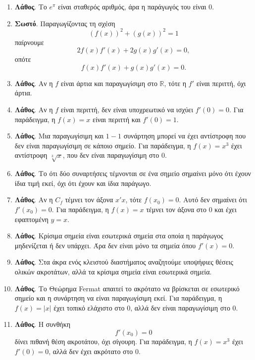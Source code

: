 \begin{enumerate}[label=\textbf{2.\arabic*.}]
\item \textbf{Λάθος}. Το $e^\pi$ είναι σταθερός αριθμός, άρα η παράγωγός του είναι $0$.

\item \textbf{Σωστό}. Παραγωγίζοντας τη σχέση
\[
(f(x))^2+(g(x))^2=1
\]
παίρνουμε
\[
2f(x)f'(x)+2g(x)g'(x)=0,
\]
οπότε
\[
f(x)f'(x)+g(x)g'(x)=0.
\]

\item \textbf{Λάθος}. Αν η $f$ είναι άρτια και παραγωγίσιμη στο $\mathbb{R}$, τότε η $f'$ είναι περιττή, όχι άρτια.

\item \textbf{Λάθος}. Αν η $f$ είναι περιττή, δεν είναι υποχρεωτικό να ισχύει $f'(0)=0$. Για παράδειγμα, η $f(x)=x$ είναι περιττή και $f'(0)=1$.

\item \textbf{Λάθος}. Μια παραγωγίσιμη και $1-1$ συνάρτηση μπορεί να έχει αντίστροφη που δεν είναι παραγωγίσιμη σε κάποιο σημείο. Για παράδειγμα, η $f(x)=x^3$ έχει αντίστροφη $\sqrt[3]{x}$, που δεν είναι παραγωγίσιμη στο $0$.

\item \textbf{Λάθος}. Το ότι δύο συναρτήσεις τέμνονται σε ένα σημείο σημαίνει μόνο ότι έχουν ίδια τιμή εκεί, όχι ότι έχουν και ίδια παράγωγο.

\item \textbf{Λάθος}. Αν η $C_f$ τέμνει τον άξονα $x'x$, τότε $f(x_0)=0$. Αυτό δεν σημαίνει ότι $f'(x_0)=0$. Για παράδειγμα, η $f(x)=x$ τέμνει τον άξονα στο $0$ και έχει εφαπτομένη $y=x$.

\item \textbf{Λάθος}. Κρίσιμα σημεία είναι εσωτερικά σημεία στα οποία η παράγωγος μηδενίζεται ή δεν υπάρχει. Άρα δεν είναι μόνο τα σημεία όπου $f'(x)=0$.

\item \textbf{Λάθος}. Στα άκρα ενός κλειστού διαστήματος αναζητούμε υποψήφιες θέσεις ολικών ακροτάτων, αλλά τα κρίσιμα σημεία είναι εσωτερικά σημεία.

\item \textbf{Λάθος}. Το Θεώρημα Fermat απαιτεί το ακρότατο να βρίσκεται σε εσωτερικό σημείο και η συνάρτηση να είναι παραγωγίσιμη εκεί. Για παράδειγμα, η $f(x)=|x|$ έχει τοπικό ελάχιστο στο $0$, αλλά δεν είναι παραγωγίσιμη στο $0$.

\item \textbf{Λάθος}. Η συνθήκη
\[
f'(x_0)=0
\]
δίνει πιθανή θέση ακροτάτου, όχι σίγουρη. Για παράδειγμα, η $f(x)=x^3$ έχει $f'(0)=0$, αλλά δεν έχει ακρότατο στο $0$.


\end{enumerate}
